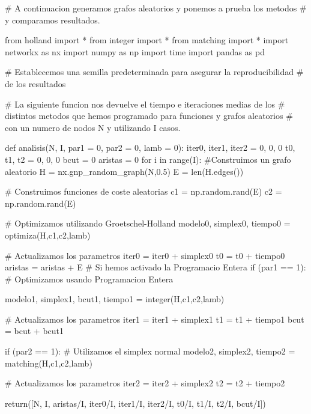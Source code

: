 \documentclass[twoside,a4paper,openright,12pt,tikz]{book}
\begin{document}
\begin{pythone}
# A continuacion generamos grafos aleatorios y ponemos a prueba los metodos
# y comparamos resultados.

from holland import *
from integer import *
from matching import *
import networkx as nx
import numpy as np
import time
import pandas as pd

# Establecemos una semilla predeterminada para asegurar la reproducibilidad
# de los resultados

# La siguiente funcion nos devuelve el tiempo e iteraciones medias de los 
# distintos metodos que hemos programado para funciones y grafos aleatorios
# con un numero de nodos N y utilizando I casos.

def analisis(N, I, par1 = 0, par2 = 0, lamb = 0):
    iter0, iter1, iter2 = 0, 0, 0
    t0, t1, t2 = 0, 0, 0
    bcut = 0
    aristas = 0
    for i in range(I):
        #Construimos un grafo aleatorio
        H = nx.gnp_random_graph(N,0.5)
        E = len(H.edges())
        
        # Construimos funciones de coste aleatorias
        c1 = np.random.rand(E)
        c2 = np.random.rand(E)
        
        # Optimizamos utilizando Groetschel-Holland
        modelo0, simplex0, tiempo0 = optimiza(H,c1,c2,lamb)
        
        # Actualizamos los parametros
        iter0 = iter0 + simplex0
        t0 = t0 + tiempo0
        aristas = aristas + E
        # Si hemos activado la Programacio Entera
        if (par1 == 1):
            # Optimizamos usando Programacion Entera

            modelo1, simplex1, bcut1, tiempo1 = integer(H,c1,c2,lamb)

            # Actualizamos los parametros
            iter1 = iter1 + simplex1
            t1 = t1 + tiempo1
            bcut = bcut + bcut1
        
        if (par2 == 1):
            # Utilizamos el simplex normal
            modelo2, simplex2, tiempo2 = matching(H,c1,c2,lamb)
            
            # Actualizamos los parametros
            iter2 = iter2 + simplex2
            t2 = t2 + tiempo2
        
    return([N, I, aristas/I, iter0/I,  iter1/I, iter2/I,  
            t0/I, t1/I, t2/I, bcut/I])
      
\end{pythone}
\newpage 
\end{document}
